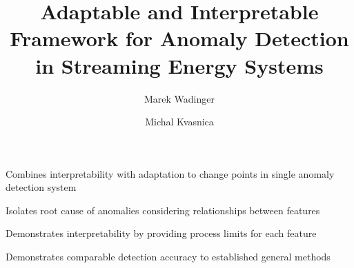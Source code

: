 \documentclass[preprint,12pt,authoryear]{elsarticle}
\begin{document}
\begin{frontmatter}


\title{Adaptable and Interpretable Framework for Anomaly Detection in Streaming Energy Systems}  %
\author[aff1]{Marek Wadinger}  %
\cortext[cor1]{}

\title{}


\author[aff1]{Michal Kvasnica}


\begin{abstract}

\end{abstract}

\begin{graphicalabstract}
\end{graphicalabstract}

\begin{highlights}
\item Combines interpretability with adaptation to change points in single anomaly detection system
\item Isolates root cause of anomalies considering relationships between features
\item Demonstrates interpretability by providing process limits for each feature
\item Demonstrates comparable detection accuracy to established general methods
\end{highlights}


\end{frontmatter}
\end{document}
